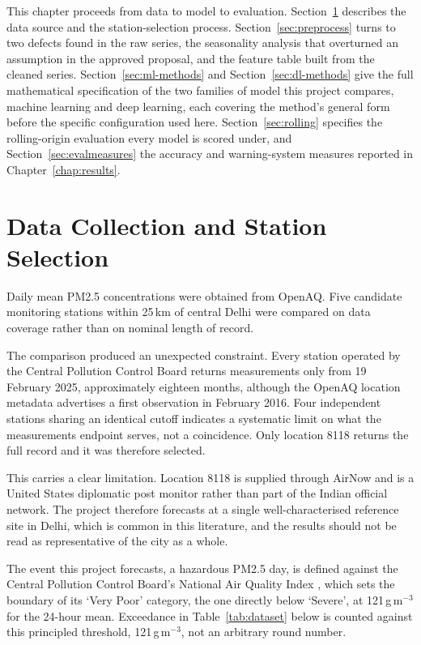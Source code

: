 \documentclass[12pt,a4paper]{report}
\begin{document}
This chapter proceeds from data to model to evaluation. Section~\ref{sec:data}
describes the data source and the station-selection process.
Section~\ref{sec:preprocess} turns to two defects found in the raw series,
the seasonality analysis that overturned an assumption in the approved
proposal, and the feature table built from the cleaned series.
Section~\ref{sec:ml-methods} and Section~\ref{sec:dl-methods} give the full
mathematical specification of the two families of model this project
compares, machine learning and deep learning, each covering the method's
general form before the specific configuration used here.
Section~\ref{sec:rolling} specifies the rolling-origin evaluation every model
is scored under, and Section~\ref{sec:evalmeasures} the accuracy
and warning-system measures reported in Chapter~\ref{chap:results}.

\section{Data Collection and Station Selection}
\label{sec:data}

Daily mean PM2.5 concentrations were obtained from OpenAQ. Five candidate
monitoring stations within 25\,km of central Delhi were compared on data
coverage rather than on nominal length of record.

The comparison produced an unexpected constraint. Every station operated by the
Central Pollution Control Board returns measurements only from 19 February 2025,
approximately eighteen months, although the OpenAQ location metadata advertises a
first observation in February 2016. Four independent stations sharing an
identical cutoff indicates a systematic limit on what the measurements endpoint
serves, not a coincidence. Only location 8118 returns the full record and
it was therefore selected.

This carries a clear limitation. Location 8118 is supplied
through AirNow and is a United States diplomatic post monitor rather than part of
the Indian official network. The project therefore forecasts at a single
well-characterised reference site in Delhi, which is common in this literature,
and the results should not be read as representative of the city as a whole.

The event this project forecasts, a hazardous PM2.5 day, is defined
against the Central Pollution Control Board's National Air Quality Index
\citep{cpcb2014aqi}, which sets the boundary of its `Very Poor' category,
the one directly below `Severe', at 121\,\textmu g\,m$^{-3}$ for the
24-hour mean. Exceedance in Table~\ref{tab:dataset} below is counted against
this principled threshold, 121\,\textmu g\,m$^{-3}$, not an arbitrary round
number.
\end{document}

